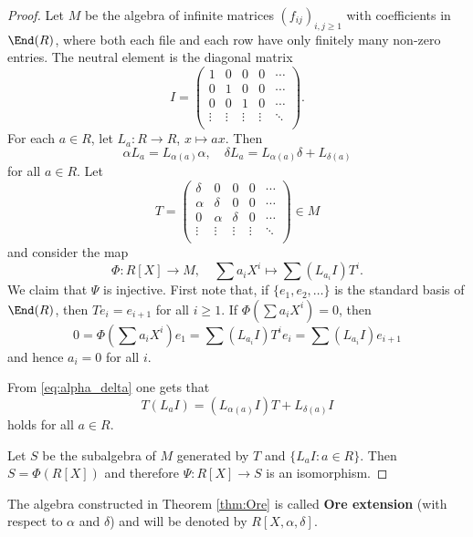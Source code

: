 \begin{proof}
    Let $M$ be the algebra of infinite matrices $(f_{ij})_{i,j\geq1}$ with coefficients 
    in $\End(R)$, where both each file and each row have only finitely many non-zero entries. The neutral 
    element is the diagonal matrix 
    \[
    I=\begin{pmatrix}
    1&0&0&0&\cdots\\
    0&1&0&0&\cdots \\
    0&0&1&0&\cdots \\
    \vdots&\vdots&\vdots&\vdots&\ddots\\
    \end{pmatrix}.
    \]
    For each $a\in R$, let $L_a\colon R\to R$, $x\mapsto ax$. Then
    \begin{equation}
    \label{eq:alpha_delta}
    \alpha L_a=L_{\alpha(a)}\alpha,\quad  
    \delta L_a=L_{\alpha(a)}\delta+L_{\delta(a)}
    \end{equation}
    for all $a\in R$. Let 
    \[
    T=\begin{pmatrix}
    \delta&0&0&0&\cdots\\
    \alpha&\delta&0&0&\cdots \\
    0&\alpha&\delta&0&\cdots \\
    \vdots&\vdots&\vdots&\vdots&\ddots\\
    \end{pmatrix}\in M
    \]
    and consider the map 
    \[ 
    \Phi\colon R[X]\to M,\quad 
    \sum a_iX^i\mapsto \sum (L_{a_i}I)T^i.
    \]
    We claim that $\Psi$ is injective. First note that, if $\{e_1,e_2,\dots\}$ is the standard basis 
    of $\End(R)$, then $Te_i=e_{i+1}$ for all $i\geq 1$. If $\Phi(\sum a_iX^i)=0$, then
    \[
    0=\Phi\left(\sum a_iX^i\right)e_1=\sum (L_{a_i}I)T^ie_i=\sum (L_{a_i}I)e_{i+1}
    \]
    and hence $a_i=0$ for all $i$. 

    From \eqref{eq:alpha_delta} one gets that 
    \[
    T(L_aI)=(L_{\alpha(a)}I)T+L_{\delta(a)}I
    \]
    holds for all $a\in R$. 

    Let $S$ be the subalgebra of $M$ generated by $T$ and 
    $\{L_aI:a\in R\}$. Then $S=\Phi(R[X])$ and therefore $\Psi\colon R[X]\to S$ is an isomorphism. 
\end{proof}

\begin{definition}
    The algebra constructed in Theorem \ref{thm:Ore} is called \textbf{Ore extension} (with respect to $\alpha$ and $\delta$) 
    and will be denoted
    by $R[X,\alpha,\delta]$. 
\end{definition}

